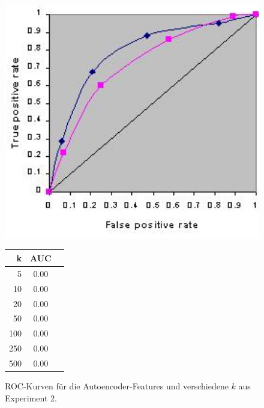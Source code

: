 \begin{figure}[!ht]
    \centering
    \includegraphics[scale=0.3]{images/roc_ph.png}
    \qquad
    \begin{tabular}[t]{| r | c | c |}
    	\hline
		k 	 & AUC  \\ \hline    
   		5    & 0.00 \\ \hline
    	10   & 0.00 \\ \hline
    	20   & 0.00 \\ \hline
    	50   & 0.00 \\ \hline
    	100  & 0.00 \\ \hline
		250  & 0.00 \\ \hline
		500  & 0.00 \\ \hline
	\end{tabular}
    \captionsetup{labelformat=andtable}
    \caption{ROC-Kurven für die Autoencoder-Features und verschiedene $k$ aus Experiment 2.}
    \label{img:roc6}
\end{figure}

